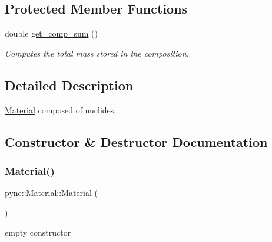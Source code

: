 \subsection*{Protected Member Functions}
\begin{DoxyCompactItemize}
\item 
\mbox{\label{classpyne_1_1_material_a6bfe2556962da33cc05eb1e88bdebf42}} 
double \hyperlink{classpyne_1_1_material_a6bfe2556962da33cc05eb1e88bdebf42}{get\+\_\+comp\+\_\+sum} ()
\begin{DoxyCompactList}\small\item\em Computes the total mass stored in the composition. \end{DoxyCompactList}\end{DoxyCompactItemize}


\subsection{Detailed Description}
\hyperlink{classpyne_1_1_material}{Material} composed of nuclides. 

\subsection{Constructor \& Destructor Documentation}
\mbox{\label{classpyne_1_1_material_af9ff0462388696834a886b2e284ccd4e}} 
\subsubsection{\texorpdfstring{Material()}{Material()}\hspace{0.1cm}{\footnotesize\ttfamily [1/4]}}
{\footnotesize\ttfamily pyne\+::\+Material\+::\+Material (\begin{DoxyParamCaption}{ }\end{DoxyParamCaption})}

empty constructor \mbox{\label{classpyne_1_1_material_a0704a8fc8a7599cb271c349240f37538}} 
